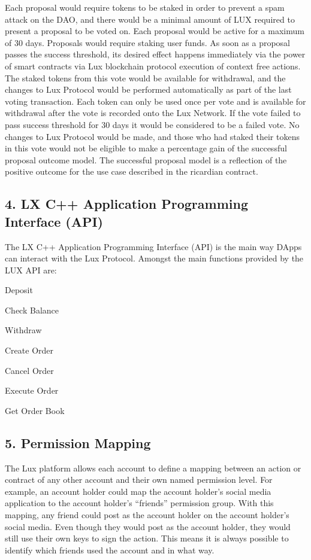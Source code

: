 \documentclass[11pt]{article}
\begin{document}
Each proposal would require tokens to be staked in order to prevent a spam attack on the DAO, and there would be a minimal amount of LUX required to present a proposal to be voted on. Each proposal would be active for a maximum of 30 days. Proposals would require staking user funds. As soon as a proposal passes the success threshold, its desired effect happens immediately via the power of smart contracts via Lux  blockchain protocol execution of context free actions. The staked tokens from this vote would be available for withdrawal, and the changes to Lux Protocol would be performed automatically as part of the last voting transaction. Each token can only be used once per vote and is available for withdrawal after the vote is recorded onto the Lux Network.  If the vote failed to pass success threshold for 30 days it would be considered to be a failed vote. No changes to Lux Protocol would be made, and those who had staked their tokens in this vote would not be eligible to make a percentage gain of the successful proposal outcome model. The successful proposal model is a reflection of the positive outcome for the use case described in the ricardian contract.


\subsection{4. LX C++ Application Programming Interface (API)}

The LX C++ Application Programming Interface (API) is the main way DApps can interact with the Lux Protocol. Amongst the main functions provided by the LUX API are:


Deposit


Check Balance


Withdraw


Create Order


Cancel Order


Execute Order


Get Order Book


\subsection{5. Permission Mapping}

The Lux  platform allows each account to define a mapping between an action or contract of any other account and their own named permission level. For example, an account holder could map the account holder's social media application to the account holder's ``friends'' permission group. With this mapping, any friend could post as the account holder on the account holder's social media. Even though they would post as the account holder, they would still use their own keys to sign the action. This means it is always possible to identify which friends used the account and in what way.
\end{document}
